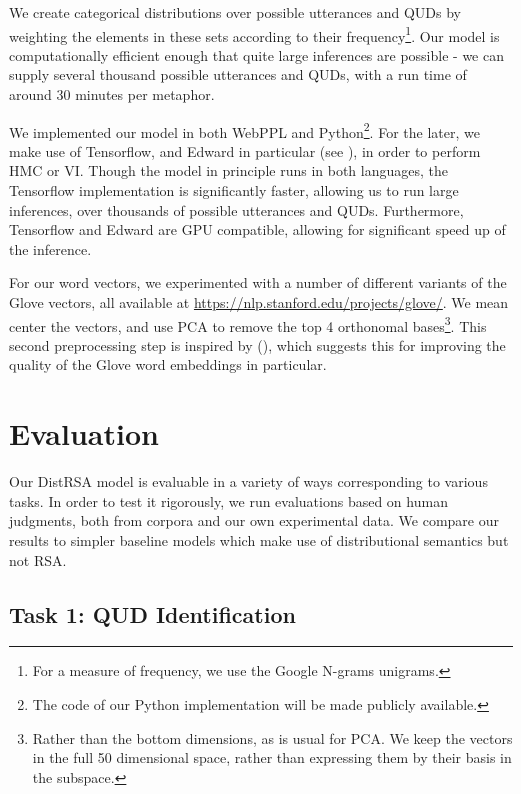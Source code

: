 \documentclass[10pt,letterpaper,twocolumn]{article}
\begin{document}
We create categorical distributions over possible utterances and QUDs by weighting the elements in these sets according to their frequency\footnote{For a measure of frequency, we use the Google N-grams unigrams.}. Our model is computationally efficient enough that quite large inferences are possible - we can supply several thousand possible utterances and QUDs, with a run time of around 30 minutes per metaphor. 


We implemented our model in both WebPPL and Python\footnote{The code of our Python implementation will be made publicly available.}. For the later, we make use of Tensorflow, and Edward in particular (see \cite{edward}), in order to perform HMC or VI. Though the model in principle runs in both languages, the Tensorflow implementation is significantly faster, allowing us to run large inferences, over thousands of possible utterances and QUDs. Furthermore, Tensorflow and Edward are GPU compatible, allowing for significant speed up of the inference.

For our word vectors, we experimented with a number of different variants of the Glove vectors, all available at \url{https://nlp.stanford.edu/projects/glove/}. We mean center the vectors, and use PCA to remove the top 4 orthonomal bases\footnote{Rather than the bottom dimensions, as is usual for PCA. We keep the vectors in the full 50 dimensional space, rather than expressing them by their basis in the subspace.}. This second preprocessing step is inspired by (\cite{mu2016geometry}), which suggests this for improving the quality of the Glove word embeddings in particular.




\section{Evaluation}

Our DistRSA model is evaluable in a variety of ways corresponding to various tasks. In order to test it rigorously, we run evaluations based on human judgments, both from corpora and our own experimental data. We compare our results to simpler baseline models which make use of distributional semantics but not RSA.

\subsection{Task 1: QUD Identification} \label{task1id}
\end{document}
